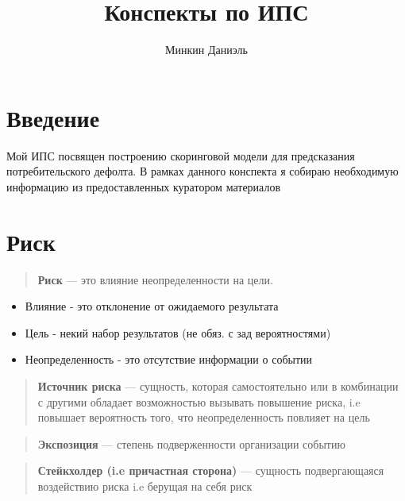 \documentclass{article}
\title{Конспекты по ИПС}
\author{Минкин Даниэль}
\begin{document}
    \maketitle

    \tableofcontents

    \section{Введение}

        Мой ИПС посвящен построению скоринговой модели для предсказания потребительского дефолта.
        В рамках данного конспекта я собираю необходимую информацию из предоставленных куратором материалов

    \section{Риск}

        \begin{quote}
            \textbf{Риск} --- это влияние неопределенности на цели.
        \end{quote}

        \begin{itemize}
            \item Влияние - это отклонение от ожидаемого результата
            \item Цель - некий набор результатов (не обяз. с зад вероятностями)
            \item Неопределенность - это отсутствие информации о событии
        \end{itemize}

        \quad

        \begin{quote}

            \textbf{Источник риска} --- сущность, которая самостоятельно или
            в комбинации с другими обладает возможностью вызывать
            повышение риска, i.e повышает вероятность того, что неопределенность повлияет на цель
        \end{quote}

        \begin{quote}
            \textbf{Экспозиция} --- степень подверженности организации событию
        \end{quote}

        \begin{quote}
            \textbf{Стейкхолдер (i.e причастная сторона)} --- сущность подвергающаяся воздействию риска i.e берущая на себя риск
        \end{quote}
\end{document}
